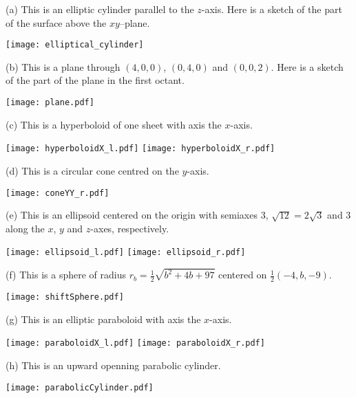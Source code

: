 \begin{answer}
(a) This is an elliptic cylinder parallel to the $z$-axis.
Here is a sketch of the part of the surface above the $xy$--plane.
\begin{center}
     \texttt{[image: elliptical\_cylinder]}
\end{center}

(b)
This is a plane through $(4,0,0)$, $(0,4,0)$ and $(0,0,2)$.
Here is a sketch of the part of the plane in the first octant.
\begin{center}
     \texttt{[image: plane.pdf]}
\end{center}

(c)
This is a hyperboloid of one sheet with axis the $x$-axis.
\begin{center}
     \texttt{[image: hyperboloidX\_l.pdf]}\qquad
     \texttt{[image: hyperboloidX\_r.pdf]}
\end{center}

(d)
This is a circular cone centred 
on the $y$-axis. 
\begin{center}
     \texttt{[image: coneYY\_r.pdf]}%
\end{center}

(e)
This is an ellipsoid centered on the origin with semiaxes $3$, 
$\sqrt{12}=2\sqrt{3}$ and $3$ along the $x$, $y$ and $z$-axes, respectively.
\begin{center}
     \texttt{[image: ellipsoid\_l.pdf]}\qquad
     \texttt{[image: ellipsoid\_r.pdf]}
\end{center}

(f) 
This is a sphere of radius $r_b=\frac{1}{2}\sqrt{b^2+4b+97}$ centered on 
$\frac{1}{2}(-4,b,-9)$.
\begin{center}
     \texttt{[image: shiftSphere.pdf]}
\end{center}

(g)
This is an elliptic paraboloid with axis the $x$-axis.
\begin{center}
     \texttt{[image: paraboloidX\_l.pdf]}\qquad
     \texttt{[image: paraboloidX\_r.pdf]}
\end{center}

(h)
This is an upward openning parabolic cylinder.
\begin{center}
     \texttt{[image: parabolicCylinder.pdf]}
\end{center}



\end{answer}

